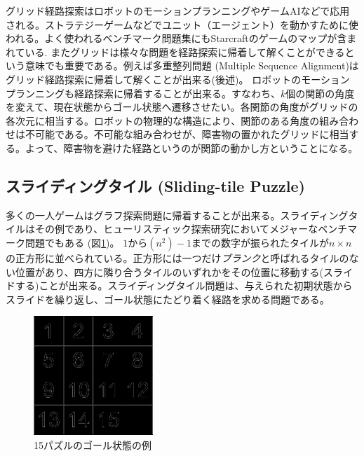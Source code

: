 \documentclass[b5paper]{report}
\begin{document}
グリッド経路探索はロボットのモーションプランニングやゲームAIなどで応用される\cite{algfoor2015comprehensive}。ストラテジーゲームなどでユニット（エージェント）を動かすために使われる。よく使われるベンチマーク問題集にもStarcraftのゲームのマップが含まれている\cite{sturtevant2012benchmarks}.
またグリッドは様々な問題を経路探索に帰着して解くことができるという意味でも重要である。例えば多重整列問題 (Multiple Sequence Alignment)はグリッド経路探索に帰着して解くことが出来る(後述)。
ロボットのモーションプランニングも経路探索に帰着することが出来る。すなわち、$k$個の関節の角度を変えて、現在状態からゴール状態へ遷移させたい。各関節の角度がグリッドの各次元に相当する。ロボットの物理的な構造により、関節のある角度の組み合わせは不可能である。不可能な組み合わせが、障害物の置かれたグリッドに相当する。よって、障害物を避けた経路というのが関節の動かし方ということになる。



\subsection{スライディングタイル (Sliding-tile Puzzle)}

多くの一人ゲームはグラフ探索問題に帰着することが出来る。スライディングタイルはその例であり、ヒューリスティック探索研究においてメジャーなベンチマーク問題でもある (図\ref{fig:15-puzzle})。
$1$から$(n^2)-1$までの数字が振られたタイルが$n\times n$の正方形に並べられている。正方形には一つだけ{\it ブランク}と呼ばれるタイルのない位置があり、四方に隣り合うタイルのいずれかをその位置に移動する(スライドする)ことが出来る。スライディングタイル問題は、与えられた初期状態からスライドを繰り返し、ゴール状態にたどり着く経路を求める問題である。

\begin{figure}
\centering
\includegraphics[bb=0 0 372 373,width=0.4\textwidth]{figures/15-puzzle.eps}
\caption{15パズルのゴール状態の例}
\label{fig:15-puzzle}
\end{figure}
\end{document}
